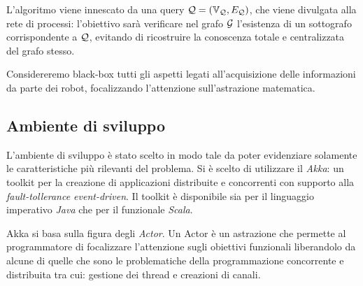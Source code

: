 \documentclass{llncs}
\begin{document}
L'algoritmo viene innescato da una query $\mathcal{Q} = (\mathbb{V}_{\mathcal{Q}}, E_{\mathcal{Q}})$, 
che viene divulgata alla rete di processi: l'obiettivo sarà verificare
nel grafo $\mathcal{G}$ l'esistenza di un sottografo corrispondente a $\mathcal{Q}$,
evitando di ricostruire la conoscenza totale e centralizzata del
grafo stesso.

Considereremo black-box tutti gli aspetti legati all'acquisizione delle informazioni
da parte dei robot, focalizzando l'attenzione sull'astrazione matematica.



\subsection{Ambiente di sviluppo}
L'ambiente di sviluppo è stato scelto in modo tale da poter evidenziare solamente
le caratteristiche più rilevanti del problema.
Si è scelto di utilizzare il \emph{Akka}: un toolkit per la creazione di applicazioni
distribuite e concorrenti con supporto alla \emph{fault-tollerance event-driven}.
Il toolkit è disponibile sia per il linguaggio imperativo \emph{Java} che per il
funzionale \emph{Scala}.

Akka si basa sulla figura degli \emph{Actor}. Un Actor è un astrazione che permette
al programmatore di focalizzare l'attenzione sugli obiettivi funzionali liberandolo
da alcune di quelle che sono le  problematiche della programmazione
concorrente e distribuita tra cui: gestione dei thread e creazioni di canali.
\end{document}
